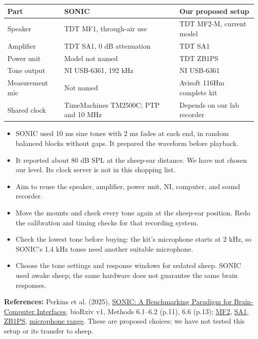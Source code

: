\documentclass[12pt,letterpaper]{article}
\newcommand{\topic}[1]{\vspace{7pt}{\large\bfseries #1}\par}
\begin{document}
\topic{What SONIC used}
{\small\renewcommand{\arraystretch}{1.18}
\begin{tabularx}{\linewidth}{@{}>{\raggedright\arraybackslash}p{1.03in} L L@{}}
\toprule
\textbf{Part} & \textbf{SONIC} & \textbf{Our proposed setup} \\
\midrule
Speaker & TDT MF1, through-air use & TDT MF2-M, current model \\
Amplifier & TDT SA1, 0 dB attenuation & TDT SA1 \\
Power unit & Model not named & TDT ZB1PS \\
Tone output & NI USB-6361, 192 kHz & NI USB-6361 \\
Measurement mic & Not named & Avisoft 116Hm complete kit \\
Shared clock & TimeMachines TM2500C; PTP and 10 MHz & Depends on our lab recorder \\
\bottomrule
\end{tabularx}}
\begin{itemize}
\item SONIC used 10 ms sine tones with 2 ms fades at each end, in random balanced blocks without gaps. It prepared the waveform before playback.
\item It reported about 80 dB SPL at the sheep-ear distance. We have not chosen our level. Its clock server is not in this shopping list.
\end{itemize}

\topic{What we would change for sheep}
\begin{itemize}
\item Aim to reuse the speaker, amplifier, power unit, NI, computer, and sound recorder.
\item Move the mounts and check every tone again at the sheep-ear position. Redo the calibration and timing checks for that recording system.
\item Check the lowest tone before buying: the kit's microphone starts at 2 kHz, so SONIC's 1.4 kHz tones need another suitable microphone.
\item Choose the tone settings and response windows for sedated sheep. SONIC used awake sheep; the same hardware does not guarantee the same brain responses.
\end{itemize}

{\footnotesize\color{muted}\textbf{References:} Perkins et al. (2025), \href{https://doi.org/10.1101/2025.09.30.679683}{SONIC: A Benchmarking Paradigm for Brain-Computer Interfaces}, bioRxiv v1, Methods 6.1--6.2 (p.11), 6.6 (p.13); \href{https://www.tdt.com/docs/hardware/mf2-multi-field-magnetic-speakers/}{MF2}, \href{https://www.tdt.com/docs/hardware/sa1-stereo-amplifier/}{SA1}, \href{https://www.tdt.com/docs/hardware/zb1ps-powered-zbus-device-chassis/}{ZB1PS}, \href{https://avisoft.com/ultrasound-microphones/cm16-cmpa/}{microphone range}. These are proposed choices; we have not tested this setup or its transfer to sheep.}
\end{document}
